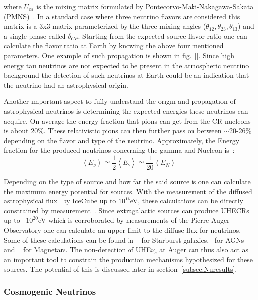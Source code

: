 where $U_{\alpha i}$ is the mixing matrix formulated by Pontecorvo-Maki-Nakagawa-Sakata (PMNS)~\cite{Pontecorvo:1957qd,10.1143/PTP.28.870}. In a standard case where three neutrino flavors are considered this matrix is a 3x3 matrix parameterized by the three mixing angles ($\theta_{12},\theta_{23},\theta_{13}$) and a single phase called $\delta_{CP}$. Starting from the expected source flavor ratio one can calculate the flavor ratio at Earth by knowing the above four mentioned parameters. One example of such propagation is shown in fig.~\ref{}. Since high energy tau neutrinos are not expected to be present in the atmospheric neutrino background the detection of such neutrinos at Earth could be an indication that the neutrino had an astrophysical origin. 

Another important aspect to fully understand the origin and propagation of astrophysical neutrinos is determining the expected energies these neutrinos can acquire. On average the energy fraction that pions can get from the CR nucleons is about 20\%. These relativistic pions can then further pass on between $\sim$20-26\% depending on the flavor and type of the neutrino. Approximately, the Energy fraction for the produced neutrinos concerning the gamma and Nucleon is~\cite{Lipari_2007}:
\begin{equation}
  \left\langle E_{\nu} \right\rangle  \simeq  \frac{1}{2}\left\langle E_{\gamma} \right\rangle \simeq  \frac{1}{20}\left\langle E_{N} \right\rangle
  \end{equation}

Depending on the type of source and how far the said source is one can calculate the maximum energy potential for sources. With the measurement of the diffused astrophysical flux~\cite{PhysRevD.110.022001} by IceCube up to $10^{16}$eV, these calculations can be directly constrained by measurement~\cite{Abbasi_2023_supernova_emission}. Since extragalactic sources can produce UHECRs up to ~$10^{20}$eV which is corroborated by measurements of the Pierre Auger Observatory one can calculate an upper limit to the diffuse flux for neutrinos. Some of these calculations can be found in ~\cite{Condorelli_2023_starburst} for Starburst galaxies, ~\cite{Murase_2023}for AGNs and ~\cite{2003ApJ...595..346Z} for Magnetars. The non-detection of UHE$\nu_s$ at Auger can thus also act as an important tool to constrain the production mechanisms hypothesized for these sources. The potential of this is discussed later in section~\ref{subsec:Nuresults}.   

\subsubsection*{Cosmogenic Neutrinos}
\label{subsubsec:CosmoNu}

